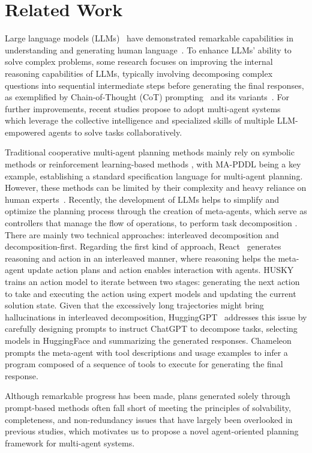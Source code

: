 \section{Related Work}

Large language models (LLMs)~\citep{gpts, achiam2023gpt, chowdhery2023palm, touvron2023llama, le2023bloom, zhang2022opt} have demonstrated remarkable capabilities in understanding and generating human language~\citep{zhao2023survey}. To enhance LLMs' ability to solve complex problems, some research focuses on improving the internal reasoning capabilities of LLMs, typically involving decomposing complex questions into sequential intermediate steps before generating the final responses, as exemplified by Chain-of-Thought (CoT) prompting~\citep{wei2022chain} and its variants~\citep{kojima2022large, wang2022self, zhou2022least, li2023camel}. For further improvements, recent studies propose to adopt multi-agent systems~\citep{wu2023autogen, hong2023metagpt, wu2025talkrightspecialistsrouting} which leverage the collective intelligence and specialized skills of multiple LLM-empowered agents to solve tasks collaboratively.


Traditional cooperative multi-agent planning methods mainly rely on symbolic methods or reinforcement learning-based methods \citep{r8, r9}, with MA-PDDL \citep{r6} being a key example, establishing a standard specification language for multi-agent planning.
However, these methods can be limited by their complexity and heavy reliance on human experts~\citep{huang2024understandingplanningllmagents}. Recently, the development of LLMs helps to simplify and optimize the planning process through the creation of meta-agents, which serve as controllers that manage the flow of operations, to perform task decomposition \citep{huang2024understandingplanningllmagents}. There are mainly two technical approaches: interleaved decomposition and decomposition-first. 
Regarding the first kind of approach, React~\citep{yao2022react} generates reasoning and action in an interleaved manner, where reasoning helps the meta-agent update action plans and action enables interaction with agents. 
HUSKY~\citep{kim2024husky} trains an action model to iterate between two stages: generating the next action to take and executing the action using expert models and updating the current solution state.
Given that the excessively long trajectories might bring hallucinations in interleaved decomposition, HuggingGPT~\citep{shen2024hugginggpt} addresses this issue by carefully designing prompts to instruct ChatGPT to decompose tasks, selecting models in HuggingFace and summarizing the generated responses. Chameleon~\citep{lu2024chameleon} prompts the meta-agent with tool descriptions and usage examples to infer a program composed of a sequence of tools to execute for generating the final response.

Although remarkable progress has been made, plans generated solely through prompt-based methods often fall short of meeting the principles of solvability, completeness, and non-redundancy issues that have largely been overlooked in previous studies,
which motivates us to propose a novel agent-oriented planning framework for multi-agent systems.


